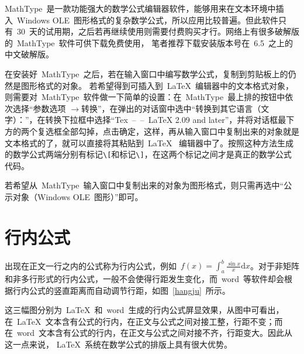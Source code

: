 MathType~是一款功能强大的数学公式编辑器软件，能够用来在文本环境中插入~Windows OLE~图形格式的复杂数学公式，所以应用比较普遍。但此软件只有~30~天的试用期，之后若再继续使用则需要付费购买才行。网络上有很多破解版的~MathType~软件可供下载免费使用，
笔者推荐下载安装版本号在~6.5~之上的中文破解版。

在安装好~MathType~之后，若在输入窗口中编写数学公式，复制到剪贴板上的仍然是图形格式的对象。
若希望得到可插入到~\LaTeX~编辑器中的文本格式对象，则需要对~MathType~软件做一下简单的设置：在~MathType~最上排的按钮中依次选择“参数选项
$\to$转换”，在弹出的对话窗中选中“转换到其它语言（文字）：”，在转换下拉框中选择“Tex~--~--~LaTeX 2.09 and later”，并将对话框最下方的两个复选框全部勾掉，点击确定，这样，再从输入窗口中复制出来的对象就是文本格式的了，就可以直接将其粘贴到~\LaTeX~
编辑器中了。按照这种方法生成的数学公式两端分别有标记\verb|\[|和标记\verb|\]|，在这两个标记之间才是真正的数学公式代码。

若希望从~MathType~输入窗口中复制出来的对象为图形格式，则只需再选中“公示对象（Windows OLE~图形）”即可。


\section{行内公式}

出现在正文一行之内的公式称为行内公式，例如~$f(x)=\int_{a}^{b}\frac{\sin{x}}{x}\mathrm{d}x$。对于非矩阵和非多行形式的行内公式，一般不会使得行距发生变化，而~word~等软件却会根据行内公式的竖直距离而自动调节行距，如图~\ref{hangju}~所示。
\begin{figure}[htbp]
\centering
\subfigure{\label{latex}}\addtocounter{subfigure}{-2}
\subfigure{\label{word}}\addtocounter{subfigure}{-2}
\subfigure{\label{pdf}}\addtocounter{subfigure}{-2}
\vspace{-1em}
\end{figure}
这三幅图分别为~\LaTeX~和~word~生成的行内公式屏显效果，从图中可看出，在~\LaTeX~文本含有公式的行内，在正文与公式之间对接工整，行距不变；而在~word~文本含有公式的行内，在正文与公式之间对接不齐，行距变大。因此从这一点来说，
\LaTeX~系统在数学公式的排版上具有很大优势。

